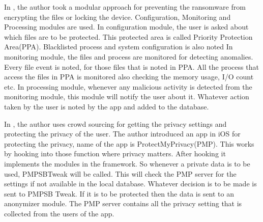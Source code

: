 \par In \cite{song2016}, the author took a modular approach for preventing the ransomware from encrypting the files or locking the device.
Configuration, Monitoring and Processing modules are used.
In configuration module, the user is asked about which files are to be protected. 
This protected area is called Priority Protection Area(PPA).
Blacklisted process and system configuration is also noted
In monitoring module, the files and process are monitored for detecting anomalies.
Every file event is noted, for those files that is noted in PPA.
All the process that access the files in PPA is monitored also checking the memory usage, I/O count etc.
In processing module, whenever any malicious activity is detected from the monitoring module, this module will notify the user about it.
Whatever action taken by the user is noted by the app and added to the database.


\par In \cite{agarwal2013}, the author uses crowd sourcing for getting the privacy settings and protecting the privacy of the user.
The author introduced an app in iOS for protecting the privacy, name of the app is ProtectMyPrivacy(PMP).
This works by hooking into those function where privacy matters.
After hooking it implements the modules in the framework.
So whenever a private data is to be used, PMPSBTweak will be called.
This will check the PMP server for the settings if not available in the local database.
Whatever decision is to be made is sent to PMPSB Tweak.
If it is to be protected then the data is sent to an anonymizer module.
The PMP server contains all the privacy setting that is collected from the users of the app.